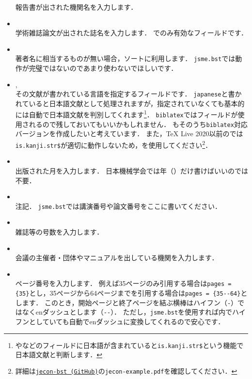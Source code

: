 \documentclass[a4paper,fleqn,uplatex,dvipdfmx]{jsarticle}
\newcommand{\jsmefile}{\texttt{jsme.bst}}
\begin{document}
\begin{itemize}
        報告書が出された機関名を入力します．
    \item \ttjournal \\
        学術雑誌論文が出された誌名を入力します．
        \hyperref[ssec:article]{\ttarticle}でのみ有効なフィールドです．
    \item \ttkey \\
        著者名に相当するものが無い場合，ソートに利用します．
        \jsmefile では動作が完璧ではないのであまり使わないでほしいです．
    \item \ttlangid, \ttlanguage \\
        その文献が書かれている言語を指定するフィールドです．
        \verb|japanese|と書かれていると日本語文献として処理されますが，指定されていなくても基本的には自動で日本語文献を判別してくれます\footnote{\ttauthor や\tttitle などのフィールドに日本語が含まれていると\texttt{is.kanji.str\$}という機能で日本語文献と判断します．}．
        \verb|biblatex|では\ttlangid フィールドが使用されるので残しておいてもいいかもしれません．
        \JSMErepos もそのうち\verb|biblatex|対応バージョンを作成したいと考えています．
        また，TeX Live 2020以前の\upBibTeX{}では\verb|is.kanji.str$|が適切に動作しないため，\ttlangid を使用してください\footnote{詳細は\href{https://github.com/ShiroTakeda/jecon-bst}{\texttt{jecon-bst (GitHub)}}の\texttt{jecon-example.pdf}を確認してください．}．
    \item \ttmonth \\
        出版された月を入力します．
        日本機械学会では年（\ttyear）だけ書けばいいので\ttmonth は不要．
    \item \ttnote \\
        注記．
        \jsmefile では講演番号や論文番号をここに書いてください．
    \item \ttnumber \\
        雑誌等の号数を入力します．
    \item \ttorganization \\
        会議の主催者・団体やマニュアルを出している機関を入力します．
    \item \ttpages \\
        ページ番号を入力します．
        例えば35ページのみ引用する場合は\verb|pages = {35}|とし，35ページから64ページまでを引用する場合は\verb|pages = {35--64}|とします．
        このとき，開始ページと終了ページを結ぶ横棒はハイフン（\verb|-|）ではなくenダッシュとします（\verb|--|）．
        ただし，\jsmefile を使用すれば\ttpages 内でハイフンとしていても自動でenダッシュに変換してくれるので安心です．

\end{itemize}
\end{document}
